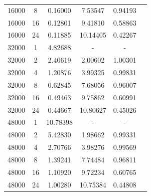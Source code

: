 \documentclass{article}
\begin{document}
\begin{table}[htbp]
\begin{tabular}{cccccc}
      16000 & 8             & 0.16000      & 7.53547  & 0.94193    \\
      16000 & 16            & 0.12801      & 9.41810  & 0.58863    \\
      16000 & 24            & 0.11885      & 10.14405 & 0.42267    \\
      \midrule
      32000 & 1             & 4.82688      & -        & -          \\
      32000 & 2             & 2.40619      & 2.00602  & 1.00301    \\
      32000 & 4             & 1.20876      & 3.99325  & 0.99831    \\
      32000 & 8             & 0.62845      & 7.68056  & 0.96007    \\
      32000 & 16            & 0.49463      & 9.75862  & 0.60991    \\
      32000 & 24            & 0.44667      & 10.80627 & 0.45026    \\
      \midrule
      48000 & 1             & 10.78398     & -        & -          \\
      48000 & 2             & 5.42830      & 1.98662  & 0.99331    \\
      48000 & 4             & 2.70766      & 3.98276  & 0.99569    \\
      48000 & 8             & 1.39241      & 7.74484  & 0.96811    \\
      48000 & 16            & 1.10920      & 9.72234  & 0.60765    \\
      48000 & 24            & 1.00280      & 10.75384 & 0.44808    \\
      \bottomrule
   \end{tabular}
   \label{tab:data}
\end{table}
\end{document}
